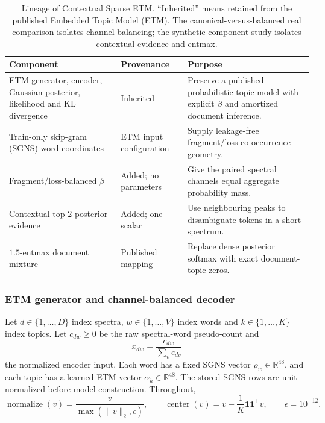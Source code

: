 \documentclass[10pt,a4paper]{article}
\newcommand{\normalize}{\operatorname{normalize}}
\newcommand{\centerop}{\operatorname{center}}
\begin{document}
\begin{table}[H]
\centering
\small
\caption{Lineage of Contextual Sparse ETM. ``Inherited'' means retained from
the published Embedded Topic Model (ETM). The canonical-versus-balanced real
comparison isolates channel balancing; the synthetic component study isolates
contextual evidence and entmax.}
\label{tab:lineage}
\begin{tabular}{@{}>{\raggedright\arraybackslash}p{}
>{\raggedright\arraybackslash}p{}
>{\raggedright\arraybackslash}p{}@{}}
\toprule
Component & Provenance & Purpose \\
\midrule
ETM generator, encoder, Gaussian posterior, likelihood and KL divergence
  & Inherited \cite{dieng2020}
  & Preserve a published probabilistic topic model with explicit $\beta$ and
    amortized document inference. \\
Train-only skip-gram (SGNS) word coordinates
  & ETM input configuration \cite{mikolov2013}
  & Supply leakage-free fragment/loss co-occurrence geometry. \\
Fragment/loss-balanced $\beta$
  & Added; no parameters
  & Give the paired spectral channels equal aggregate probability mass. \\
Contextual top-2 posterior evidence
  & Added; one scalar
  & Use neighbouring peaks to disambiguate tokens in a short spectrum. \\
$1.5$-entmax document mixture
  & Published mapping \cite{peters2019}
  & Replace dense posterior softmax with exact document-topic zeros. \\
\bottomrule
\end{tabular}
\end{table}

\subsubsection{ETM generator and channel-balanced decoder}

Let $d\in\{1,\ldots,D\}$ index spectra, $w\in\{1,\ldots,V\}$ index words and
$k\in\{1,\ldots,K\}$ index topics. Let $c_{dw}\geq0$ be the raw spectral-word
pseudo-count and
\begin{equation}
  x_{dw}=\frac{c_{dw}}{\sum_v c_{dv}}
  \label{eq:normalized-bow}
\end{equation}
the normalized encoder input. Each word has a fixed SGNS vector
$\rho_w\in\mathbb R^{48}$, and each topic has a learned ETM vector
$\alpha_k\in\mathbb R^{48}$. The stored SGNS rows are unit-normalized before
model construction. Throughout,
\[
  \normalize(v)=\frac{v}{\max(\lVert v\rVert_2,\epsilon)},\qquad
  \centerop(v)=v-\frac{1}{K}\mathbf 1\mathbf 1^\top v,\qquad
  \epsilon=10^{-12}.
\]
\end{document}
